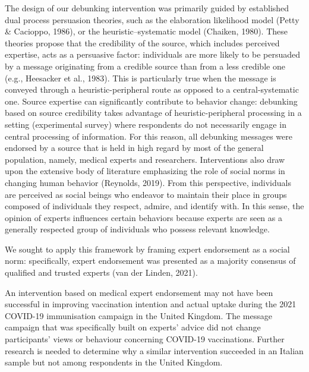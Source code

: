 \documentclass[authordate, empirical]{jote-new-article}
\begin{document}
The design of our debunking intervention was primarily guided by established dual process persuasion theories, such as the elaboration likelihood model (Petty \& Cacioppo, 1986), or the heuristic--systematic model (Chaiken, 1980). These theories propose that the credibility of the source, which includes perceived expertise, acts as a persuasive factor: individuals are more likely to be persuaded by a message originating from a credible source than from a less credible one (e.g., Heesacker et al., 1983). This is particularly true when the message is conveyed through a heuristic-peripheral route as opposed to a central-systematic one. Source expertise can significantly contribute to behavior change: debunking based on source credibility takes advantage of heuristic-peripheral processing in a setting (experimental survey) where respondents do not necessarily engage in central processing of information. For this reason, all debunking messages were endorsed by a source that is held in high regard by most of the general population, namely, medical experts and researchers. Interventions also draw upon the extensive body of literature emphasizing the role of social norms in changing human behavior (Reynolds, 2019). From this perspective, individuals are perceived as social beings who endeavor to maintain their place in groups composed of individuals they respect, admire, and identify with. In this sense, the opinion of experts influences certain behaviors because experts are seen as a generally respected group of individuals who possess relevant knowledge.



We sought to apply this framework by framing expert endorsement as a social norm: specifically, expert endorsement was presented as a majority consensus of qualified and trusted experts (van der Linden, 2021).

\begin{takeHomeMessage}

  An intervention based on medical expert endorsement may not have been successful in improving vaccination intention and actual uptake during the 2021 COVID-19 immunisation campaign in the United Kingdom. The message campaign that was specifically built on experts' advice did not change participants' views or behaviour concerning COVID-19 vaccinations. Further research is needed to determine why a similar intervention succeeded in an Italian sample but not among respondents in the United Kingdom.

\end{takeHomeMessage}
\end{document}

